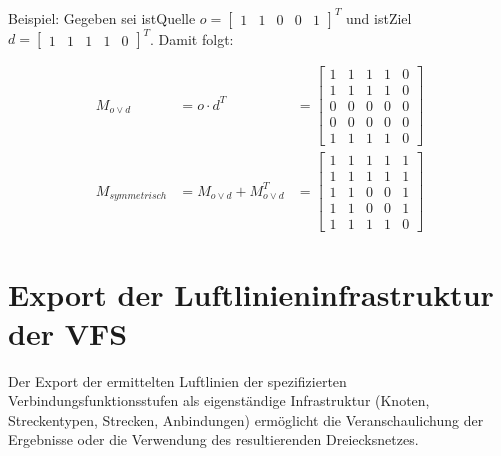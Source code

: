 Beispiel: Gegeben sei
\glqq istQuelle\grqq{}  $ o = \left[ 
\begin{array}{ccccc}
1 & 1 &0 & 0 & 1 
\end{array} 
\right]^T $ und \glqq istZiel\grqq{} $ d = \left[ \begin{array}{ccccc}
1 & 1 & 1 & 1 & 0 
\end{array} 
\right]^T $. Damit folgt:

\begin{align*}
M_{o \lor d } &= o \cdot d^T &= \left[ 
\begin{array}{ccccc}
1 & 1 & 1 & 1 & 0 \\ 
1 & 1 & 1 & 1 & 0 \\ 
0 & 0 & 0 & 0 & 0 \\ 
0 & 0 & 0 & 0 & 0 \\ 
1 & 1 & 1 & 1 & 0
\end{array} \right] \\
M_{symmetrisch} &= M_{o \lor d } + M_{o \lor d }^T &= 
\left[
\begin{array}{ccccc}
1 & 1 & 1 & 1 & 1 \\ 
1 & 1 & 1 & 1 & 1 \\ 
1 & 1 & 0 & 0 & 1 \\ 
1 & 1 & 0 & 0 & 1 \\ 
1 & 1 & 1 & 1 & 0
\end{array} \right]
\end{align*}

\section{Export der Luftlinieninfrastruktur der VFS}
Der Export der ermittelten Luftlinien der spezifizierten Verbindungsfunktionsstufen als eigenständige Infrastruktur (Knoten, Streckentypen, Strecken, Anbindungen) ermöglicht die Veranschaulichung der Ergebnisse oder die Verwendung des resultierenden Dreiecksnetzes.

